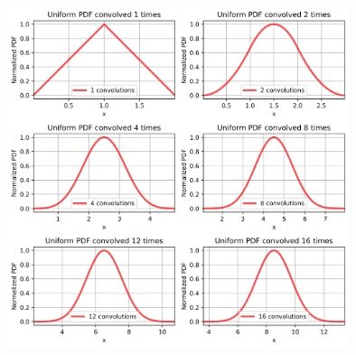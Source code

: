 \documentclass[a4paper, 10pt]{article}
\begin{document}
\begin{solution}
\begin{center}
    \includegraphics[width=0.75\textwidth]{images/problem_6_2_comparation.png}
\end{center}
\end{solution}

\newpage
\end{document}
